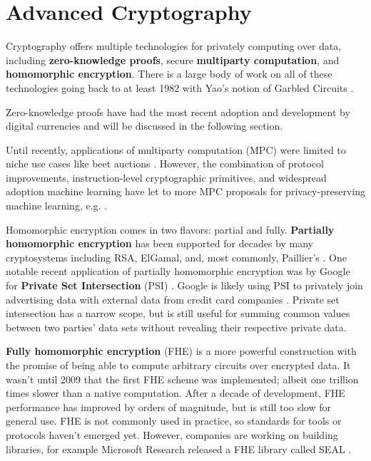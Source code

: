 \documentclass[nobib]{tufte-handout}
\begin{document}
\section{Advanced Cryptography}

Cryptography offers multiple technologies for privately computing over data,
including \textbf{zero-knowledge proofs}, secure \textbf{multiparty
computation}, and \textbf{homomorphic encryption}. There is a large body of work
on all of these technologies going back to at least 1982 with Yao's notion of
Garbled Circuits \cite{DBLP:conf/focs/Yao82b}.

Zero-knowledge proofs have had the most recent adoption and development by
digital currencies and will be discussed in the following section.

Until recently, applications of multiparty computation (MPC) were limited to
niche use cases like beet auctions \cite{DBLP:conf/fc/BogetoftCDGJKNNNPST09}.
However, the combination of protocol improvements, instruction-level
cryptographic primitives, and widespread adoption machine learning have let to
more MPC proposals for privacy-preserving machine learning, e.g.
\cite{DBLP:conf/ccs/BonawitzIKMMPRS17}.

Homomorphic encryption comes in two flavors: partial and fully.
\textbf{Partially homomorphic encryption} has been supported for decades by many
cryptosystems including RSA, ElGamal, and, most commonly, Paillier's
\cite{DBLP:conf/eurocrypt/Paillier99}. One notable recent application of
partially homomorphic encryption was by Google for \textbf{Private Set
Intersection} (PSI) \cite{google-psi}. Google is likely using PSI to privately
join advertising data with external data from credit card companies
\cite{google-mastercard}. Private set intersection has a narrow scope, but is
still useful for summing common values between two parties’ data sets without
revealing their respective private data.

\textbf{Fully homomorphic encryption} (FHE) is a more powerful construction with
the promise of being able to compute arbitrary circuits over encrypted data. It
wasn't until 2009 \cite{DBLP:conf/stoc/Gentry09} that the first FHE scheme was
implemented; albeit one trillion times slower than a native computation. After a
decade of development, FHE performance has improved by orders of magnitude, but
is still too slow for general use. FHE is not commonly used in practice, so
standards for tools or protocols haven't emerged yet. However, companies
are working on building libraries, for example Microsoft Research released a FHE library
called SEAL \cite{sealcrypto}.
\end{document}
